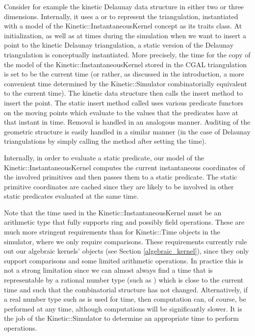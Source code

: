 Consider for example the kinetic Delaunay data structure in either two
or three dimensions.  Internally, it uses a
 or
 to represent the
triangulation, instantiated with a model of the
Kinetic::InstantaneousKernel concept as its traits class.  At
initialization, as well as at times during the simulation when we want
to insert a point to the kinetic Delaunay triangulation, a static
version of the Delaunay triangulation is conceptually instantiated.
More precisely, the time for the copy of the model of the
Kinetic::InstantaneousKernel stored in the CGAL triangulation is set
to be the current time (or rather, as discussed in the introduction, a
more convenient time determined by the Kinetic::Simulator
combinatorially equivalent to the current time).  The kinetic data
structure then calls the
 insert
method to insert the point.  The static insert method called uses
various predicate functors on the moving points which evaluate to the
values that the predicates have at that instant in time. Removal is
handled in an analogous manner. Auditing of the geometric structure is
easily handled in a similar manner (in the case of Delaunay
triangulations by simply calling the  method after
setting the time).

Internally, in order to evaluate a static predicate, our model of the
Kinetic::InstantaneousKernel computes the current instantaneous
coordinates of the involved primitives and then passes them to a
static predicate. The static primitive coordinates are cached since
they are likely to be involved in other static predicates evaluated at
the same time.


Note that the time used in the Kinetic::InstantaneousKernel must be an
arithmetic type that fully supports ring and possibly field
operations.  These are much more stringent requirements than for
Kinetic::Time objects in the simulator, where we only require
comparisons. These requirements currently rule out our algebraic
kernels'  objects (see Section \ref{algebraic_kernel}),
since they only support comparisons and some limited arithmetic
operations. In practice this is not a strong limitation since we can
almost always find a time that is representable by a rational number
type (such as ) which is close to the current time and such
that the combinatorial structure has not changed. Alternatively, if a
real number type such as  is used for time, then
computation can, of course, be performed at any time, although
computations will be significantly slower.
It is the job of the Kinetic::Simulator to determine an appropriate
time to perform operations.


